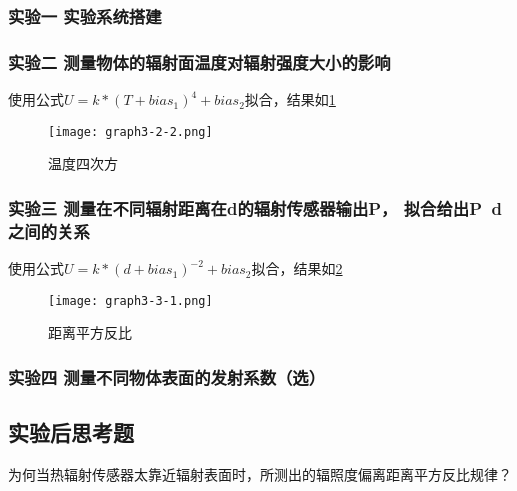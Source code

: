 \documentclass[dvipsnames, svgnames,a4paper,11pt]{article}
\begin{document}
	\subsubsection{实验一 \quad 实验系统搭建}

	



	\subsubsection{实验二 \quad 测量物体的辐射面温度对辐射强度大小的影响}



	使用公式$U=k*(T+bias_1)^4+bias_2$拟合，结果如\cref{fig:graph3-2-2}
	\begin{figure}[htbp]
		\centering
		\texttt{[image: graph3-2-2.png]}
		\caption{温度四次方}
		\label{fig:graph3-2-2}
	\end{figure}




	\subsubsection{实验三 \quad 测量在不同辐射距离在d的辐射传感器输出P， 拟合给出P~d之间的关系}



	使用公式$U=k*(d+bias_1)^{-2}+bias_2$拟合，结果如\cref{fig:graph3-3-1}
	\begin{figure}[htbp]
		\centering
		\texttt{[image: graph3-3-1.png]}
		\caption{距离平方反比}
		\label{fig:graph3-3-1}
	\end{figure}






	\subsubsection{实验四 \quad 测量不同物体表面的发射系数（选）}
	


			




\subsection{实验后思考题}

\begin{question}
	为何当热辐射传感器太靠近辐射表面时，所测出的辐照度偏离距离平方反比规律？
\end{question}
\end{document}
